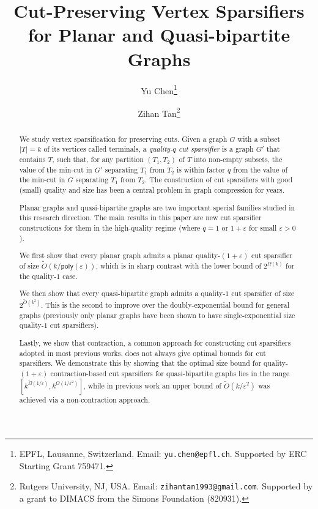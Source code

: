 \documentclass[11pt]{article}
\theoremstyle{definition}
\newcommand{\eps}{{\varepsilon}}
\newcommand{\poly}{\mathsf{poly}}
\begin{document}
\begin{titlepage}
	
\title{Cut-Preserving Vertex Sparsifiers for Planar and Quasi-bipartite Graphs}
	
\author{Yu Chen\thanks{EPFL, Lausanne, Switzerland. Email: {\tt yu.chen@epfl.ch}. Supported by ERC Starting Grant 759471.} \and Zihan Tan\thanks{Rutgers University, NJ, USA. Email: {\tt zihantan1993@gmail.com}. Supported by a grant to DIMACS from the Simons Foundation (820931).}} 


	\maketitle
	
	
	\thispagestyle{empty}
	\begin{abstract}
We study vertex sparsification for preserving cuts.
Given a graph $G$ with a subset $|T|=k$ of its vertices called terminals, a \emph{quality-$q$ cut sparsifier} is a graph $G'$ that contains $T$, such that, for any partition $(T_1,T_2)$ of $T$ into non-empty subsets, the value of the min-cut in $G'$ separating $T_1$ from $T_2$ is within factor $q$ from the value of the min-cut in $G$ separating $T_1$ from $T_2$. 
The construction of cut sparsifiers with good (small) quality and size has been a central problem in graph compression for years.

Planar graphs and quasi-bipartite graphs are two important special families studied in this research direction.
The main results in this paper are new cut sparsifier constructions for them in the high-quality regime (where $q=1$ or $1+\eps$ for small $\eps>0$).



We first show that every planar graph admits a planar quality-$(1+\eps)$ cut sparsifier of size $\tilde O(k/\poly(\eps))$, which is in sharp contrast with the lower bound of $2^{\Omega(k)}$ for the quality-$1$ case.

We then show that every quasi-bipartite graph admits a quality-$1$ cut sparsifier of size $2^{\tilde O(k^2)}$. This is the second to improve over the doubly-exponential bound for general graphs (previously only planar graphs have been shown to have single-exponential size quality-$1$ cut sparsifiers).

Lastly, we show that contraction, a common approach for constructing cut sparsifiers adopted in most previous works, does not always give optimal bounds for cut sparsifiers. We demonstrate this by showing that the optimal size bound for quality-$(1+\eps)$ contraction-based cut sparsifiers for quasi-bipartite graphs lies in the range $[k^{\tilde\Omega(1/\eps)},k^{O(1/\eps^2)}]$, while in previous work an upper bound of $\tilde O(k/\eps^2)$ was achieved via a non-contraction approach.


	\end{abstract}
\end{titlepage}
\end{document}
